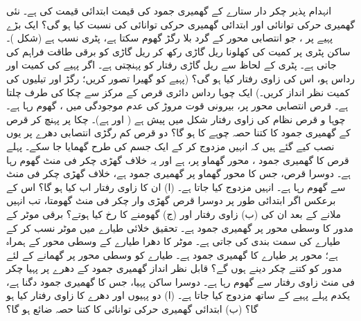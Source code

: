 انہدام پذیر چکر دار  ستارے  کے  گھمیری جمود کی قیمت  ابتدائی قیمت کی    ہے۔ نئی گھمیری حرکی توانائی  اور ابتدائی گھمیری حرکی توانائی کی نسبت کیا ہو گی؟
ایک بڑے  پہیے پر ، جو انتصابی محور کے گرد بلا رگڑ گھوم سکتا ہے، پٹری نسب ہے (شکل )۔ ساکن پٹری پر کمیت  کی کھلونا   ریل گاڑی   رکھ کر ریل گاڑی کو برقی طاقت فراہم کی جاتی ہے۔ پٹری کے لحاظ سے ریل گاڑی  رفتار کو پہنچتی ہے۔ اگر پہیے کی کمیت  اور رداس  ہو، اس کی زاوی رفتار کیا ہو گی؟ (پہیے کو گھیرا تصور کریں؛  رگڑ اور تیلیوں کی کمیت نظر انداز کریں۔)
ایک چوہا رداس   دائری قرص کے  مرکز سے چکا کی طرف چلتا ہے۔ قرص انتصابی محور  پر، بیرونی قوت مروڑ کی عدم موجودگی میں  ، گھوم  رہا ہے۔ چوہا و قرص نظام کی زاوی رفتار شکل  میں پیش ہے ( اور  ہے)۔ چکا پر پہنچ کر قرص کے گھمیری جمود کا کتنا حصہ   چوہے کا ہو گا؟
دو قرص کم رگڑی  انتصابی دھرے پر  یوں نصب کیے گئے ہیں کہ انہیں  مزدوج کر کے ایک جسم کی طرح گھمایا جا سکے۔ پہلے قرص کا گھمیری 
جمود ، محور گھماو پر،  ہے اور یہ خلاف گھڑی  چکر فی منٹ گھوم رہا ہے۔ دوسرا قرص، جس کا  محور  گھماو پر گھمیری جمود  ہے، خلاف گھڑی  چکر فی منٹ سے گھوم رہا ہے۔ انہیں مزدوج کیا جاتا ہے۔ (ا)  ان کا زاوی رفتار  اب کیا ہو گا؟ اس کے برعکس اگر  ابتدائی طور پر دوسرا قرص گھڑی وار  چکر فی منٹ گھومتا، تب انہیں ملانے کے بعد  ان کی (ب) زاوی رفتار  اور (ج) گھومنے کا رخ کیا ہوتے؟
برقی موٹر کے مدور  کا وسطی محور پر گھمیری جمود  ہے۔  تحقیق خلائی طیارے میں موٹر نسب کر کے طیارے کی سمت بندی  کی جاتی ہے۔ موٹر کا دھرا طیارے کے وسطی محور کے ہمراہ ہے؛ محور پر طیارے  کا گھمیری جمود  ہے۔ طیارے کو وسطی محور پر  گھمانے کے لئے مدور کو کتنے چکر دینے ہوں گے؟
قابل نظر انداز گھمیری جمود کے دھرے پر پہیا  چکر فی منٹ زاوی رفتار سے  گھوم رہا ہے۔ دوسرا  ساکن پہیا، جس کا گھمیری جمود دگنا ہے، یکدم پہلے پہیے کے ساتھ مزدوج  کیا جاتا ہے۔ (ا)  دو پہیوں اور دھرے  کا زاوی رفتار کیا ہو گا؟ (ب)  ابتدائی  گھمیری حرکی  توانائی کا کتنا حصہ ضائع ہو گا؟
